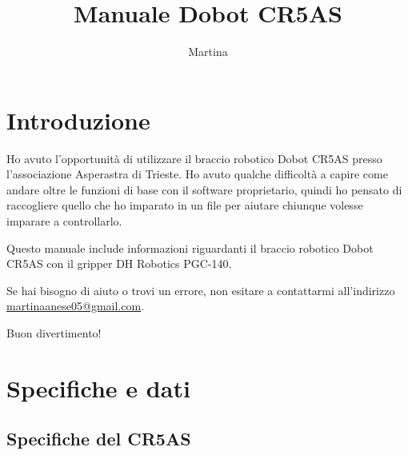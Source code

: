 \documentclass[11pt,a4paper]{article}
\title{\textbf{Manuale Dobot CR5AS}}
\author{Martina}
\date{}
\begin{document}
\maketitle
\tableofcontents
\newpage

\section{Introduzione}
\label{sec:introduction}

Ho avuto l'opportunità di utilizzare il braccio robotico Dobot CR5AS presso l'associazione Asperastra di Trieste. Ho avuto qualche difficoltà a capire come andare oltre le funzioni di base con il software proprietario, quindi ho pensato di raccogliere quello che ho imparato in un file per aiutare chiunque volesse imparare a controllarlo.

Questo manuale include informazioni riguardanti il braccio robotico Dobot CR5AS con il gripper DH Robotics PGC-140.

Se hai bisogno di aiuto o trovi un errore, non esitare a contattarmi all'indirizzo \href{mailto:martinaanese05@gmail.com}{martinaanese05@gmail.com}.

Buon divertimento!

\section{Specifiche e dati}
\label{sec:specs}

\subsection{Specifiche del CR5AS}
\label{sec:specs-cr5as}
\end{document}

